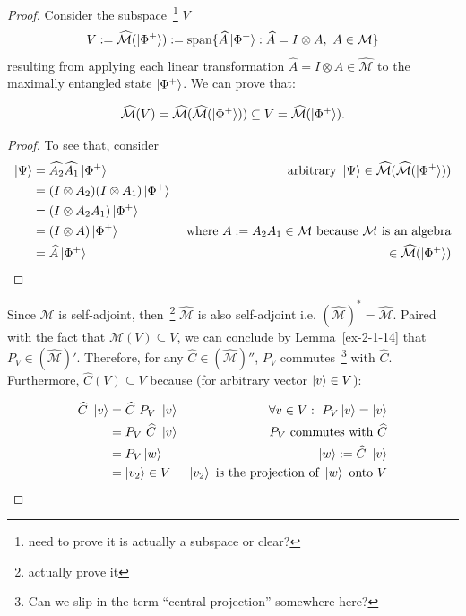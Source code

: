 \begin{proof}
Consider the subspace~\footnote{need to prove it is actually a subspace or clear?} $V$ 
\begin{equation}
 V := \widehat{\mathcal{M}}(\ket{\Phi^+}) := \text{span} \{ \widehat{A}\ket{\Phi^+}: \widehat{A} = I \otimes A, \ A \in \mathcal{M}  \}   
\end{equation}
resulting from applying each linear transformation $\widehat{A} = I \otimes A \in \widehat{\mathcal{M}}$ to the maximally entangled state $\ket{\Phi^+}$. We can prove that:
\begin{claim}
    \[\widehat{\mathcal{M}}(V)  = \widehat{\mathcal{M}}(\widehat{\mathcal{M}}(\ket{\Phi^+}))\subseteq V = \widehat{\mathcal{M}}(\ket{\Phi^+}).\]
\end{claim}
\begin{proof}
To see that, consider
\begin{align*}
    \ket{\Psi} &= \widehat{A_2} \widehat{A_1} \ket{\Phi^+} & \text{ arbitrary } \ket{\Psi} \in \widehat{\mathcal{M}}(\widehat{\mathcal{M}}(\ket{\Phi^+}))\\
    &= (I \otimes A_2)(I \otimes A_1) \ket{\Phi^+}\\
    &= (I \otimes A_2 A_1) \ket{\Phi^+}\\
    &= (I \otimes A) \ket{\Phi^+} & \text{ where } A := A_2 A_1 \in \mathcal{M} \text{ because } \mathcal{M} \text{ is an algebra}\\
    &= \widehat{A} \ket{\Phi^+} & \in \widehat{\mathcal{M}}(\ket{\Phi^+})
\end{align*}
\end{proof}

Since $\mathcal{M}$ is self-adjoint, then~\footnote{actually prove it} $\widehat{\mathcal{M}}$ is also self-adjoint i.e. $(\widehat{\mathcal{M}})^* = \widehat{\mathcal{M}}$. Paired with the fact that $\widehat{\mathcal{M}}(V) \subseteq V$, we can conclude by Lemma~\ref{ex-2-1-14} that $P_V \in (\widehat{\mathcal{M}})'$. Therefore, for any $\widehat{C} \in (\widehat{\mathcal{M}})''$, $P_V$ commutes~\footnote{Can we slip in the term ``central projection'' somewhere here?} with $\widehat{C}$. Furthermore, $\widehat{C}(V) \subseteq V$ because (for arbitrary vector $\ket{v} \in V$):

\begin{align*}
    \widehat{C}\ \ket{v} & =   \widehat{C} \ P_V\ \ket{v} &\forall v \in V:\ P_V \ket{v} = \ket{v} \\
    &= P_V \ \widehat{C} \ \ket{v} &  P_V \text{ commutes with } \widehat{C} \\
    &= P_V \ket{w} & \ket{w} := \widehat{C} \ \ket{v}\\
    &= \ket{v_2} \in V & \ket{v_2} \text{ is the projection of } \ket{w} \text{ onto } V\\
\end{align*}


\end{proof}
